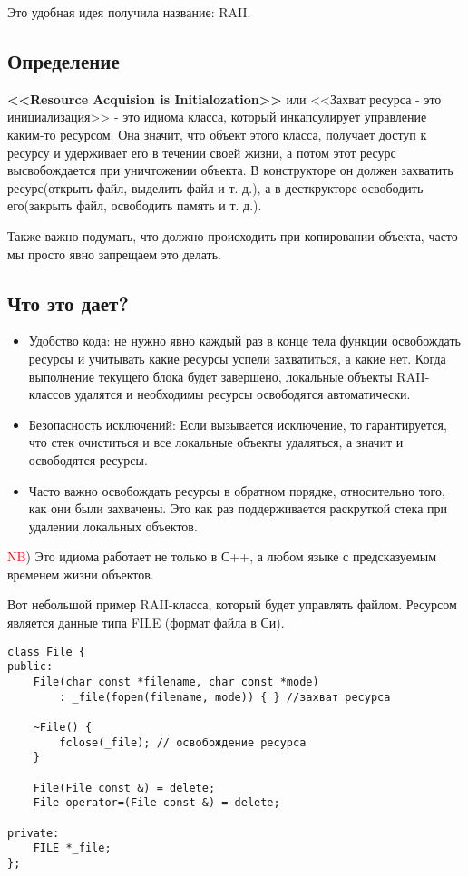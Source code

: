Это удобная идея получила название: RAII.

\subsection{Определение}

\textbf{<<Resource Acquision is Initialozation>>} или <<Захват ресурса - это инициализация>> - это идиома класса, который инкапсулирует управление каким-то ресурсом. Она значит, что объект этого класса, получает доступ к ресурсу и удерживает его в течении своей жизни, а потом этот ресурс высвобождается при уничтожении объекта.
В конструкторе он должен захватить ресурс(открыть файл, выделить файл и т. д.), а в десткрукторе освободить его(закрыть файл, освободить память и т. д.).

Также важно подумать, что должно происходить при копировании объекта, часто мы просто явно запрещаем это делать.

\subsection{Что это дает?}
\begin{itemize}
\item Удобство кода: не нужно явно каждый раз в конце тела функции освобождать ресурсы и учитывать какие ресурсы успели захватиться, а какие нет. Когда выполнение текущего блока будет завершено, локальные объекты RAII-классов удалятся и необходимы ресурсы освободятся автоматически.
\item Безопасность исключений: Если вызывается исключение, то гарантируется, что стек очиститься и все локальные объекты удаляться, а значит и освободятся ресурсы.
\item Часто важно освобождать ресурсы в обратном порядке, относительно того, как они были захвачены. Это как раз поддерживается раскруткой стека при удалении локальных объектов.
\end{itemize}

\textcolor{red}{NB}) Это идиома работает не только в С++, а любом языке с предсказуемым временем жизни объектов.


Вот небольшой пример RAII-класса, который будет управлять файлом.
Ресурсом является данные типа FILE (формат файла в Си).
\begin{verbatim}
class File {
public:
    File(char const *filename, char const *mode)
        : _file(fopen(filename, mode)) { } //захват ресурса

    ~File() {
        fclose(_file); // освобождение ресурса
    }

    File(File const &) = delete;
    File operator=(File const &) = delete;

private:
    FILE *_file;
};
\end{verbatim}

